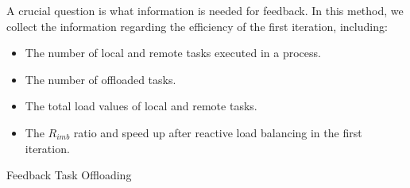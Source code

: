 A crucial question is what information is needed for feedback. In this method, we collect the information regarding the efficiency of the first iteration, including:

\begin{itemize}
	\item The number of local and remote tasks executed in a process.
	\item The number of offloaded tasks.
	\item The total load values of local and remote tasks.
	\item The $R_{imb}$ ratio and speed up after reactive load balancing in the first iteration.
\end{itemize}

\begin{algorithm}[t]
\caption{Feedback Task Offloading} \label{alg:feedback_task_offloading}
	\DontPrintSemicolon %
	\SetNoFillComment		%
	


\end{algorithm}
